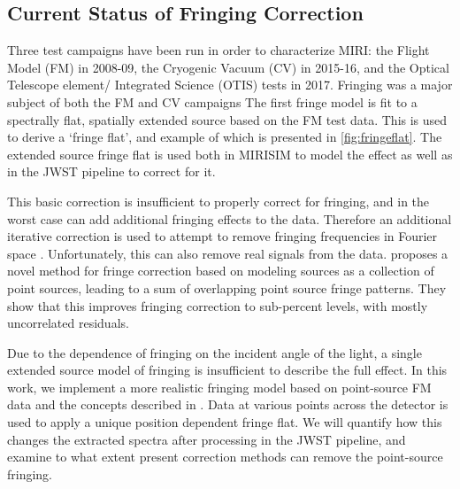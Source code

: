 \subsection{Current Status of Fringing Correction}
Three test campaigns have been run in order to characterize MIRI: the Flight Model (FM) in 2008-09, the Cryogenic Vacuum (CV) in 2015-16, and the Optical Telescope element/ Integrated Science (OTIS) tests in 2017. 
Fringing was a major subject of both the FM and CV campaigns
The first fringe model is fit to a spectrally flat, spatially extended source based on the FM test data.
This is used to derive a `fringe flat', and example of which is presented in \ref{fig:fringeflat}.
The extended source fringe flat is used both in MIRISIM to model the effect as well as in the JWST pipeline to correct for it.

This basic correction is insufficient to properly correct for fringing, and in the worst case can add additional fringing effects to the data. 
Therefore an additional iterative correction is used to attempt to remove fringing frequencies in Fourier space \parencite{Lahuis2003,Lahuis2018}.
Unfortunately, this can also remove real signals from the data.
\parencite{Argyriou2020} proposes a novel method for fringe correction based on modeling sources as a collection of point sources, leading to a sum of overlapping point source fringe patterns.
They show that this improves fringing correction to sub-percent levels, with mostly uncorrelated residuals.

Due to the dependence of fringing on the incident angle of the light, a single extended source model of fringing is insufficient to describe the full effect. 
In this work, we implement a more realistic fringing model based on point-source FM data and the concepts described in \parencite{Argyriou2018a}. 
Data at various points across the detector is used to apply a unique position dependent fringe flat.
We  will quantify how this changes the extracted spectra after processing in the JWST pipeline, and examine to what extent present correction methods can remove the point-source fringing.


